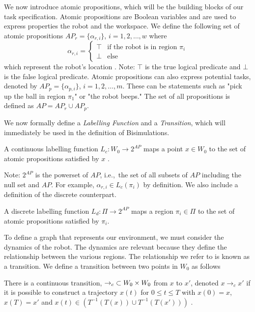 We now introduce atomic propositions, which will be the building blocks of our task specification. Atomic propositions are Boolean variables and are used to express properties the robot and the workspace. We define the following set of atomic propositions $AP_r = \{\alpha_{r,i}\}$, $i=1,2,\dots,w$ where 
\[\alpha_{r,i} =  \begin{cases}
\top & \text{if the robot is in region $\pi_i$} \\
\bot & \text{else}
\end{cases}
\]
which represent the robot's location \cite{guo15}. Note: $\top$ is the true logical predicate and $\bot$ is the false logical predicate. Atomic propositions can also express potential tasks, denoted by $AP_p = \{\alpha_{p,i}\}$, $i=1,2,\dots,m$. These can be statements such as "pick up the ball in region $\pi_1$" or "the robot beeps." The set of all propositions is defined as $AP = AP_r \cup AP_p$.

We now formally define a \textit{Labelling Function} and a \textit{Transition}, which will immediately be used in the definition of Bisimulations. 

\theoremstyle{definition}
\begin{definition}
\label{defCLF}
A continuous labelling function $L_c:W_0 \rightarrow 2^{AP}$ maps a point $x \in W_0$ to the set of atomic propositions satisfied by $x$ \cite{guo15}.
\end{definition} 
Note: $2^{AP}$ is the powerset of $AP$, i.e.,\ the set of all subsets of $AP$ including the null set and $AP$. For example, $\alpha_{r,i} \in L_c(\pi_i)$ by definition. 
We also include a definition of the discrete counterpart. 

\theoremstyle{definition}
\begin{definition}
\label{defDLF}
A discrete labelling function $L_d:\Pi\rightarrow 2^{AP}$ maps a region $\pi_i \in \Pi$ to the set of atomic propositions satisfied by $\pi_i$.
\end{definition} 


To define a graph that represents our environment, we must consider the dynamics of the robot. The dynamics are relevant because they define the relationship between the various regions. The relationship we refer to is known as a transition. We define a transition between two points in $W_0$ as follows
\theoremstyle{definition}
\begin{definition}
\label{defCTransition}
There is a continuous transition, $\rightarrow_c \hspace{0.1cm} \subset W_0 \times W_0$ from $x$ to $x'$, denoted $x \rightarrow_c x'$ if it is possible to construct a trajectory $x(t)$ for $0 \leq t \leq T$ with $x(0)=x$, $x(T) =x'$ and $x(t) \in (T^{-1}(T(x))\cup T^{-1}(T(x')))$ \cite{fainekos09}.
\end{definition}

